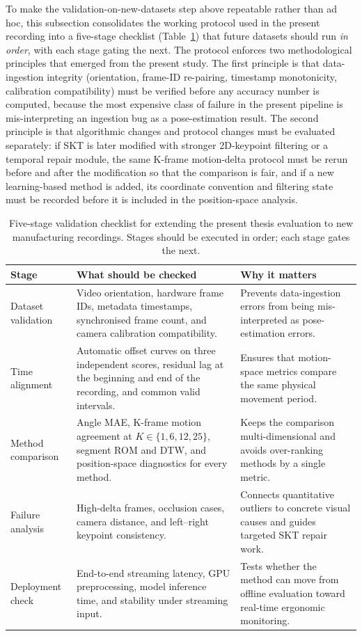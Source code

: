 \documentclass[12pt,a4paper]{article}
\begin{document}
To make the validation-on-new-datasets step above repeatable rather than
ad hoc, this subsection consolidates the working protocol used in the
present recording into a five-stage checklist
(Table~\ref{tab:validation_checklist}) that future datasets should run
\emph{in order}, with each stage gating the next.
The protocol enforces two methodological principles that emerged from
the present study.
The first principle is that data-ingestion integrity (orientation,
frame-ID re-pairing, timestamp monotonicity, calibration compatibility)
must be verified before any accuracy number is computed, because the
most expensive class of failure in the present pipeline is
mis-interpreting an ingestion bug as a pose-estimation result.
The second principle is that algorithmic changes and protocol changes
must be evaluated separately: if SKT is later modified with stronger
2D-keypoint filtering or a temporal repair module, the same K-frame
motion-delta protocol must be rerun before and after the modification
so that the comparison is fair, and if a new learning-based method is
added, its coordinate convention and filtering state must be recorded
before it is included in the position-space analysis.

\begin{table}[!htbp]
  \centering
  \caption{Five-stage validation checklist for extending the present thesis evaluation to new manufacturing recordings. Stages should be executed in order; each stage gates the next.}
  \label{tab:validation_checklist}
  \small
  \begin{tabularx}{\linewidth}{p{3.2cm}XX}
    \toprule
    Stage & What should be checked & Why it matters \\
    \midrule
    Dataset validation
    & Video orientation, hardware frame IDs, metadata timestamps, synchronised frame count, and camera calibration compatibility.
    & Prevents data-ingestion errors from being mis-interpreted as pose-estimation errors. \\
    Time alignment
    & Automatic offset curves on three independent scores, residual lag at the beginning and end of the recording, and common valid intervals.
    & Ensures that motion-space metrics compare the same physical movement period. \\
    Method comparison
    & Angle MAE, K-frame motion agreement at $K\in\{1,6,12,25\}$, segment ROM and DTW, and position-space diagnostics for every method.
    & Keeps the comparison multi-dimensional and avoids over-ranking methods by a single metric. \\
    Failure analysis
    & High-delta frames, occlusion cases, camera distance, and left--right keypoint consistency.
    & Connects quantitative outliers to concrete visual causes and guides targeted SKT repair work. \\
    Deployment check
    & End-to-end streaming latency, GPU preprocessing, model inference time, and stability under streaming input.
    & Tests whether the method can move from offline evaluation toward real-time ergonomic monitoring. \\
    \bottomrule
  \end{tabularx}
\end{table}
\end{document}
